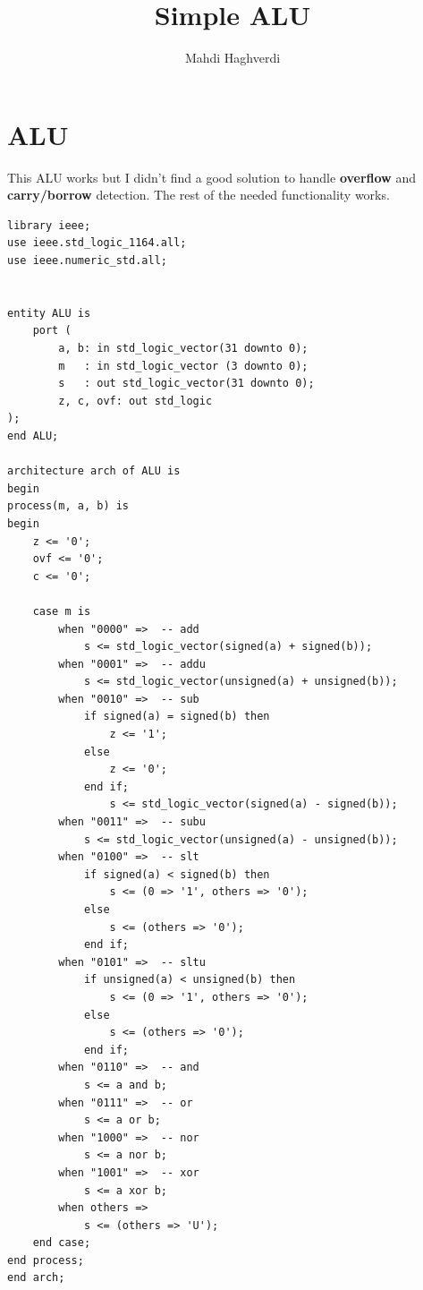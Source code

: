 \documentclass[dvipsnames, svgnames, x11names, a4paper, 11pt]{article}
\title{Simple ALU}
\author{Mahdi Haghverdi}
\begin{document}
    \maketitle
    \tableofcontents
\section{ALU}
This ALU works but I didn't find a good solution to handle \textbf{overflow} and \textbf{carry/borrow} detection. The rest of the needed functionality works.
\begin{lstlisting}
library ieee;
use ieee.std_logic_1164.all;
use ieee.numeric_std.all;


entity ALU is
    port (
        a, b: in std_logic_vector(31 downto 0);
        m   : in std_logic_vector (3 downto 0);
        s   : out std_logic_vector(31 downto 0);
        z, c, ovf: out std_logic
);
end ALU;

architecture arch of ALU is
begin
process(m, a, b) is
begin
    z <= '0';
    ovf <= '0';
    c <= '0';

    case m is
        when "0000" =>  -- add
            s <= std_logic_vector(signed(a) + signed(b));
        when "0001" =>  -- addu
            s <= std_logic_vector(unsigned(a) + unsigned(b));
        when "0010" =>  -- sub
            if signed(a) = signed(b) then
                z <= '1';
            else
                z <= '0';
            end if;
                s <= std_logic_vector(signed(a) - signed(b));
        when "0011" =>  -- subu
            s <= std_logic_vector(unsigned(a) - unsigned(b));
        when "0100" =>  -- slt
            if signed(a) < signed(b) then
                s <= (0 => '1', others => '0');
            else
                s <= (others => '0');
            end if;
        when "0101" =>  -- sltu
            if unsigned(a) < unsigned(b) then
                s <= (0 => '1', others => '0');
            else
                s <= (others => '0');
            end if;
        when "0110" =>  -- and
            s <= a and b;
        when "0111" =>  -- or
            s <= a or b;
        when "1000" =>  -- nor
            s <= a nor b;
        when "1001" =>  -- xor
            s <= a xor b;
        when others =>
            s <= (others => 'U');
    end case;
end process;
end arch;
\end{lstlisting}
\end{document}

